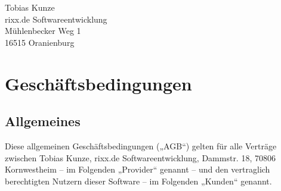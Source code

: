 \documentclass{terms}
\begin{document}
\maketitle

\begin{center}
Tobias Kunze\\
rixx.de Softwareentwicklung\\
Mühlenbecker Weg 1\\
16515 Oranienburg
\end{center}
\sloppy

\section{Geschäftsbedingungen}

\subsection{Allgemeines}

Diese allgemeinen Geschäftsbedingungen („AGB“) gelten für alle Verträge zwischen Tobias Kunze, rixx.de Softwareentwicklung, Dammstr. 18, 70806 Kornwestheim – im Folgenden „Provider“ genannt –
und den vertraglich berechtigten Nutzern dieser Software – im Folgenden „Kunden“ genannt.
\end{document}
